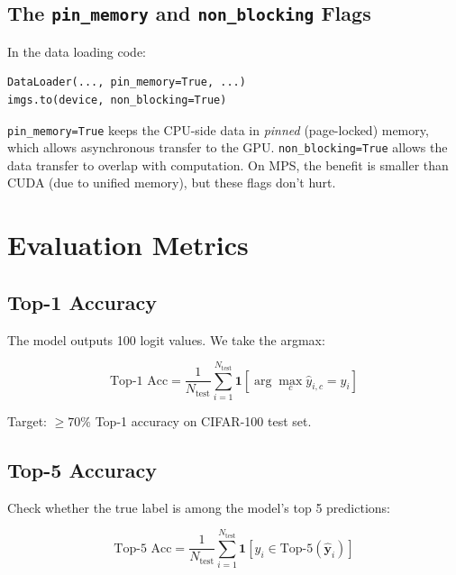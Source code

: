 \documentclass[12pt, a4paper]{report}
\newcommand{\vect}[1]{\bm{#1}}
\begin{document}
\section{The \texttt{pin\_memory} and \texttt{non\_blocking} Flags}

In the data loading code:

\begin{lstlisting}
DataLoader(..., pin_memory=True, ...)
imgs.to(device, non_blocking=True)
\end{lstlisting}

\texttt{pin\_memory=True} keeps the CPU-side data in \emph{pinned} (page-locked) memory, which allows asynchronous transfer to the GPU. \texttt{non\_blocking=True} allows the data transfer to overlap with computation. On MPS, the benefit is smaller than CUDA (due to unified memory), but these flags don't hurt.

\chapter{Evaluation Metrics}

\section{Top-1 Accuracy}

The model outputs 100 logit values. We take the argmax:

\begin{equation}
\text{Top-1 Acc} = \frac{1}{N_{\text{test}}} \sum_{i=1}^{N_{\text{test}}} \mathbf{1}\left[\arg\max_c \hat{y}_{i,c} = y_i\right]
\end{equation}

Target: $\geq 70\%$ Top-1 accuracy on CIFAR-100 test set.

\section{Top-5 Accuracy}

Check whether the true label is among the model's top 5 predictions:

\begin{equation}
\text{Top-5 Acc} = \frac{1}{N_{\text{test}}} \sum_{i=1}^{N_{\text{test}}} \mathbf{1}\left[y_i \in \text{Top-5}(\hat{\vect{y}}_i)\right]
\end{equation}
\end{document}
